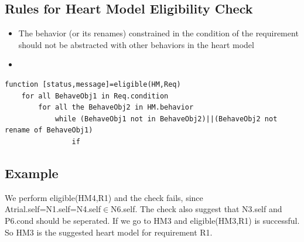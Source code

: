 \documentclass{llncs}
\begin{document}
\subsection{Rules for Heart Model Eligibility Check}

\begin{itemize}
	\item The behavior (or its renames) constrained in the condition of the requirement should not be abstracted with other behaviors in the heart model
    \item 
    
\end{itemize}

\begin{Verbatim}
function [status,message]=eligible(HM,Req)
	for all BehaveObj1 in Req.condition
    	for all the BehaveObj2 in HM.behavior
        	while (BehaveObj1 not in BehaveObj2)||(BehaveObj2 not rename of BehaveObj1)
            	if 
\end{Verbatim}

\subsection{Example}
We perform \textsf{eligible(HM4,R1)} and the check fails, since \textsf{Atrial.self=N1.self=N4.self$\in$N6.self}. The check also suggest that \textsf{N3.self} and \textsf{P6.cond} should be seperated. If we go to HM3 and \textsf{eligible(HM3,R1)} is successful. So HM3 is the suggested heart model for requirement \textsf{R1}.

%

{ \small 

}
\end{document}

